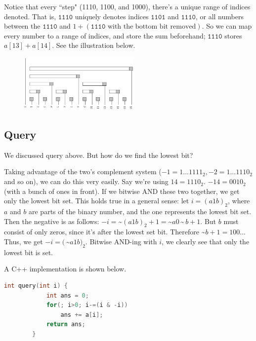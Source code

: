 \documentclass{article}
\begin{document}
    Notice that every ``step" (1110, 1100, and 1000), there's a unique range of indices denoted. That is, $\texttt{1110}$ uniquely denotes indices $\texttt{1101}$ and $\texttt{1110}$, or all numbers between the $\texttt{1110}$ and $1+(\texttt{1110} \text{ with the bottom bit removed})$. So we can map every number to a range of indices, and store the sum beforehand; $\texttt{1110}$ stores $a[13]+a[14]$. See the illustration below.

    \begin{figure}
      \center
      \includegraphics[width=0.525\textwidth]{BIT.PNG}
    \end{figure}
    
    \subsection{Query}
        We discussed query above. But how do we find the lowest bit?
        
        Taking advantage of the two's complement system ($-1 = 1...1111_2, -2 = 1...1110_2$ and so on), we can do this very easily. Say we're using $14 = 1110_2$. $-14 = 0010_2$ (with a bunch of ones in front). If we bitwise AND these two together, we get only the lowest bit set. This holds true in a general sense: let $i = (a1b)_2$, where $a$ and $b$ are parts of the binary number, and the one represents the lowest bit set. Then the negative is as follows: $-i = $\textasciitilde$(a1b)_2 + 1 = $\textasciitilde$ a0\,$\textasciitilde$ \,b + 1$. But $b$ must consist of only zeros, since it's after the lowest set bit. Therefore \textasciitilde $b + 1 = 100...$ Thus, we get $-i = (\,$\textasciitilde$ a1b)_2$. Bitwise AND-ing with $i$, we clearly see that only the lowest bit is set.
        
        
        A C++ implementation is shown below.
        \begin{lstlisting}[language=C++]
        int query(int i) {
            int ans = 0;
            for(; i>0; i-=(i & -i))
                ans += a[i];
            return ans;
        }
        \end{lstlisting}
        
\end{document}
